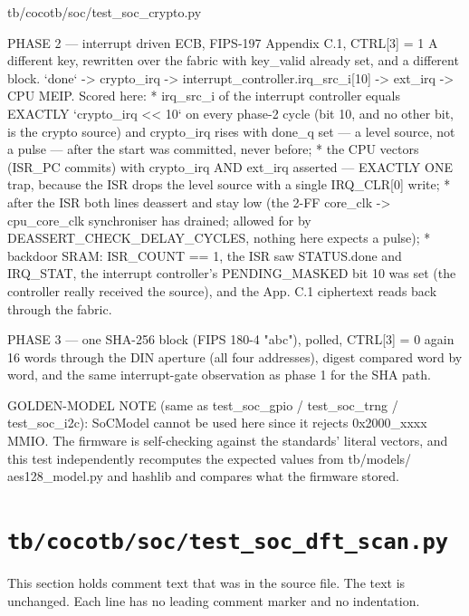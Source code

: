 \begin{relocated}{tb/cocotb/soc/test_soc_crypto.py}
\begin{textblock}
PHASE 2 — interrupt driven ECB, FIPS-197 Appendix C.1, CTRL[3] = 1
A different key, rewritten over the fabric with key_valid already set, and a different block.
`done` -> crypto_irq -> interrupt_controller.irq_src_i[10] -> ext_irq -> CPU MEIP. Scored here:
* irq_src_i of the interrupt controller equals EXACTLY `crypto_irq << 10` on every phase-2 cycle
(bit 10, and no other bit, is the crypto source) and crypto_irq rises with done_q set — a
level source, not a pulse — after the start was committed, never before;
* the CPU vectors (ISR_PC commits) with crypto_irq AND ext_irq asserted — EXACTLY ONE trap,
because the ISR drops the level source with a single IRQ_CLR[0] write;
* after the ISR both lines deassert and stay low (the 2-FF core_clk -> cpu_core_clk synchroniser
has drained; allowed for by DEASSERT_CHECK_DELAY_CYCLES, nothing here expects a pulse);
* backdoor SRAM: ISR_COUNT == 1, the ISR saw STATUS.done and IRQ_STAT, the interrupt
controller's PENDING_MASKED bit 10 was set (the controller really received the source), and
the App. C.1 ciphertext reads back through the fabric.

PHASE 3 — one SHA-256 block (FIPS 180-4 "abc"), polled, CTRL[3] = 0 again
16 words through the DIN aperture (all four addresses), digest compared word by word, and the same
interrupt-gate observation as phase 1 for the SHA path.

GOLDEN-MODEL NOTE (same as test_soc_gpio / test_soc_trng / test_soc_i2c): SoCModel cannot be used
here since it rejects 0x2000_xxxx MMIO. The firmware is self-checking against the standards'
literal vectors, and this test independently recomputes the expected values from tb/models/
aes128_model.py and hashlib and compares what the firmware stored.
\end{textblock}

\end{relocated}

\section{\texttt{tb/cocotb/soc/test\_soc\_dft\_scan.py}}\label{tm:suite:soc-test-soc-dft-scan}

This section holds comment text that was in the source file. The text is unchanged. Each line has no leading comment marker and no indentation.

